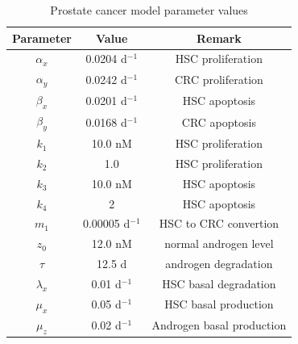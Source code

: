 \begin{table}[h]
\caption{Prostate cancer model parameter values\label{prostate}}
\centering
\small
\begin{tabular}{|c|c|c|}
\hline
Parameter  & Value & Remark  \\\hline
$\alpha_x$ & 0.0204 d$^{-1}$ & HSC proliferation \\
$\alpha_y$ & 0.0242 d$^{-1}$ & CRC proliferation  \\
$\beta_x$  & 0.0201 d$^{-1}$ & HSC apoptosis  \\
$\beta_y$  & 0.0168 d$^{-1}$ & CRC apoptosis \\
$k_1$     & 10.0 nM & HSC proliferation  \\
$k_2$     & 1.0 & HSC proliferation  \\
$k_3$     & 10.0 nM & HSC apoptosis  \\
$k_4$     &  2 & HSC apoptosis   \\
$m_1$     & 0.00005 d$^{-1}$ & HSC to CRC convertion  \\
$z_0$     & 12.0 nM & normal androgen level  \\
$\tau$     & 12.5 d & androgen degradation  \\
$\lambda_x$     & 0.01 d$^{-1}$ & HSC basal degradation \\
$\mu_x$     & 0.05 d$^{-1}$ & HSC basal production\\
$\mu_z$     & 0.02 d$^{-1}$ & Androgen basal production \\
\hline
\end{tabular}
\end{table}
